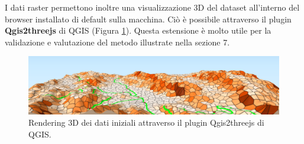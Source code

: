 I dati raster permettono inoltre una visualizzazione 3D del dataset all'interno del browser installato di default sulla macchina. Ciò è possibile attraverso il plugin \textbf{Qgis2threejs} di QGIS (Figura \ref{threejs}). Questa estensione è molto utile per la validazione e valutazione del metodo illustrate nella sezione 7.

\begin{figure}[h]
	\centering
	\includegraphics[width=1\textwidth]{images/Threejs}
	\caption{Rendering 3D dei dati iniziali attraverso il plugin Qgis2threejs di QGIS.}
	\label{threejs}
\end{figure}
